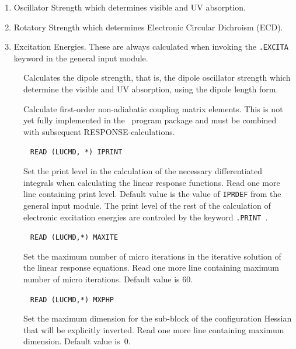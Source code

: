 \begin{enumerate}
\item Oscillator Strength which determines
visible and UV absorption. 
\item Rotatory Strength which determines
Electronic Circular Dichroism
(ECD).
\item Excitation Energies. 
These are always calculated when
invoking the \verb|.EXCITA| keyword in the general input module.
\end{enumerate}

\begin{description}
\item[] Calculates the dipole strength, that is, the 
dipole oscillator strength which determine the visible and UV
absorption, using the dipole length form.

\item[] Calculate first-order non-adiabatic coupling
matrix elements. This is not yet
fully implemented in the \aba\ 
program package and must be combined with subsequent
RESPONSE-calculations.

\item[]\verb| |\newline
\verb|READ (LUCMD, *) IPRINT|

Set the print level in the calculation of the necessary differentiated
integrals when calculating the linear response functions. Read one
more line containing print level. Default value is the value of 
\verb|IPRDEF| from the general input module. The print level of the
rest of the calculation of electronic excitation energies are
controled by the keyword \verb|.PRINT |. 

\item[]\verb| |\newline
\verb|READ (LUCMD,*) MAXITE|

Set the maximum number of micro iterations in the iterative
solution of the linear response equations. Read
one more line containing maximum number of micro iterations.
Default value is 60.

\item[]\verb| |\newline
\verb|READ (LUCMD,*) MXPHP|

Set the maximum dimension for the sub-block of the configuration
Hessian that will be explicitly inverted. Read one more line
containing maximum dimension. Default value is~0.


\end{description}
